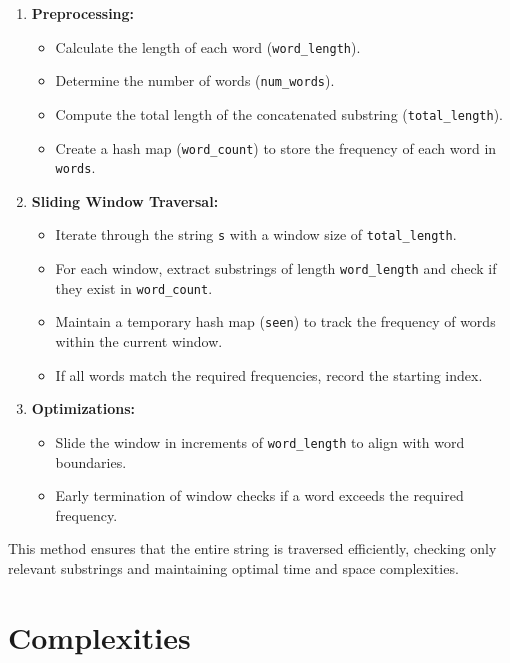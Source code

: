 \begin{enumerate}
    \item \textbf{Preprocessing:}
    \begin{itemize}
        \item Calculate the length of each word (\texttt{word\_length}).
        \item Determine the number of words (\texttt{num\_words}).
        \item Compute the total length of the concatenated substring (\texttt{total\_length}).
        \item Create a hash map (\texttt{word\_count}) to store the frequency of each word in \texttt{words}.
    \end{itemize}
    
    \item \textbf{Sliding Window Traversal:}
    \begin{itemize}
        \item Iterate through the string \texttt{s} with a window size of \texttt{total\_length}.
        \item For each window, extract substrings of length \texttt{word\_length} and check if they exist in \texttt{word\_count}.
        \item Maintain a temporary hash map (\texttt{seen}) to track the frequency of words within the current window.
        \item If all words match the required frequencies, record the starting index.
    \end{itemize}
    
    \item \textbf{Optimizations:}
    \begin{itemize}
        \item Slide the window in increments of \texttt{word\_length} to align with word boundaries.
        \item Early termination of window checks if a word exceeds the required frequency.
    \end{itemize}
\end{enumerate}

This method ensures that the entire string is traversed efficiently, checking only relevant substrings and maintaining optimal time and space complexities.


\section*{Complexities}

